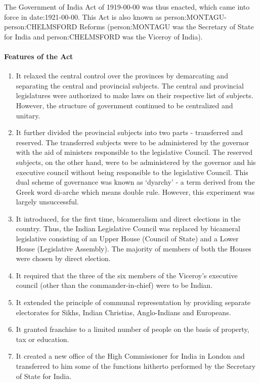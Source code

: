 \begin{multicols}{2}
The Government of India Act of 1919-00-00 was thus enacted, which came into force in \gls{date:1921-00-00}. This Act is also known as \gls{person:MONTAGU}-\gls{person:CHELMSFORD} Reforms (\gls{person:MONTAGU} was the Secretary of State for India and \gls{person:CHELMSFORD} was the Viceroy of India).

\paragraph{Features of the Act}
\begin{enumerate}
  \item It relaxed the central control over the provinces by demarcating and separating the central and provincial subjects. The central and provincial legislatures were authorized to make laws on their respective list of subjects. However, the structure of government continued to be
  centralized and unitary.
  \item It further divided the provincial subjects into two parts - transferred and reserved. The transferred subjects were to be administered by the governor with the aid of ministers responsible to the legislative Council. The reserved subjects, on the other hand, were to be administered by the governor and his executive council without being responsible to the legislative Council. This dual scheme of governance was known as
   `dyarchy' - a term derived from the Greek word di-arche which means double rule. However, this experiment was largely unsuccessful.
  \item It introduced, for the first time, bicameralism and direct elections in the country. Thus, the Indian Legislative Council was replaced by bicameral legislative consisting of an Upper House (Council of State) and a Lower House (Legislative Assembly). The majority of members of both the Houses were chosen by direct election.
  \item It required that the three of the six members of the Viceroy's executive council (other than the commander-in-chief) were to be Indian.
  \item It extended the principle of communal representation by providing separate electorates for Sikhs, Indian Christias, Anglo-Indians and Europeans.
  \item It granted franchise to a limited number of people on the basis of property, tax or education.
  \item It created a new office of the High Commissioner for India in London and transferred to him some of the functions hitherto performed by the Secretary of State for India.

\end{enumerate}
\end{multicols}
